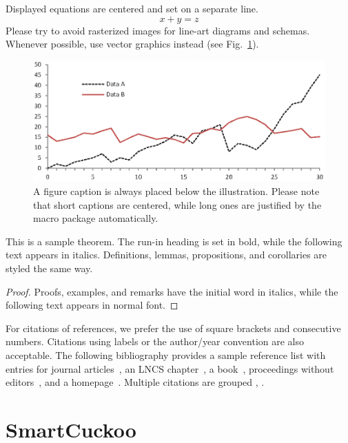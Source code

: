 \documentclass[runningheads]{llncs}
\begin{document}
\noindent Displayed equations are centered and set on a separate
line.
\begin{equation}
x + y = z
\end{equation}
Please try to avoid rasterized images for line-art diagrams and
schemas. Whenever possible, use vector graphics instead (see
Fig.~\ref{fig1}).

\begin{figure}
\includegraphics[width=\textwidth]{fig1.eps}
\caption{A figure caption is always placed below the illustration.
Please note that short captions are centered, while long ones are
justified by the macro package automatically.} \label{fig1}
\end{figure}

\begin{theorem}
This is a sample theorem. The run-in heading is set in bold, while
the following text appears in italics. Definitions, lemmas,
propositions, and corollaries are styled the same way.
\end{theorem}
%
%
\begin{proof}
Proofs, examples, and remarks have the initial word in italics,
while the following text appears in normal font.
\end{proof}
For citations of references, we prefer the use of square brackets
and consecutive numbers. Citations using labels or the author/year
convention are also acceptable. The following bibliography provides
a sample reference list with entries for journal
articles~\cite{ref_article1}, an LNCS chapter~\cite{ref_lncs1}, a
book~\cite{ref_book1}, proceedings without editors~\cite{ref_proc1},
and a homepage~\cite{ref_url1}. Multiple citations are grouped
\cite{ref_article1,ref_lncs1,ref_book1},
\cite{ref_article1,ref_book1,ref_proc1,ref_url1}.

\section{SmartCuckoo}
\end{document}
